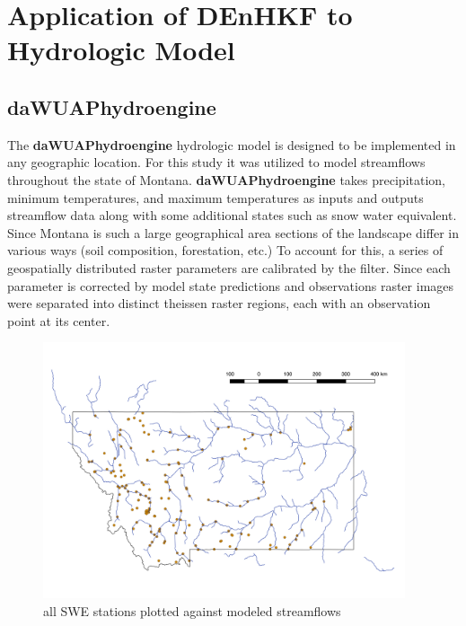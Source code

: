 \chapter{Application of DEnHKF to Hydrologic Model}

\section{daWUAPhydroengine}

The \textbf{daWUAPhydroengine} hydrologic model is designed to be implemented in any geographic location. For this study it was utilized to model streamflows throughout the state of Montana. \textbf{daWUAPhydroengine} takes precipitation, minimum temperatures, and maximum temperatures as inputs and outputs streamflow data along with some additional states such as snow water equivalent. Since Montana is such a large geographical area sections of the landscape differ in various ways (soil composition, forestation, etc.) To account for this, a series of geospatially distributed raster parameters are calibrated by the filter. Since each parameter is corrected by model state predictions and observations raster images were separated into distinct theissen raster regions, each with an observation point at its center.

\begin{figure}[h]
    \centering
    \includegraphics[width=0.95\textwidth]{stations}
    \caption{all SWE stations plotted against modeled streamflows}
    \label{fig:stations}
\end{figure}

